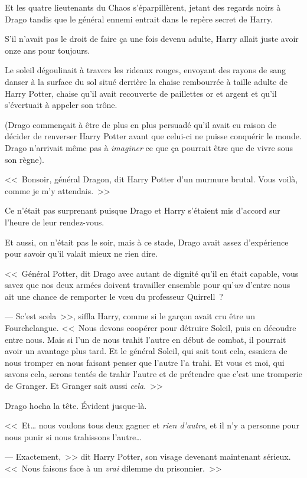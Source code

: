 Et les quatre lieutenants du Chaos s'éparpillèrent, jetant des regards noirs à Drago tandis que le général ennemi entrait dans le repère secret de Harry.

S'il n'avait pas le droit de faire ça une fois devenu adulte, Harry allait juste avoir onze ans pour toujours.

\later

Le soleil dégoulinait à travers les rideaux rouges, envoyant des rayons de sang danser à la surface du sol situé derrière la chaise rembourrée à taille adulte de Harry Potter, chaise qu'il avait recouverte de paillettes or et argent et qu'il s'évertuait à appeler son trône.

(Drago commençait à être de plus en plus persuadé qu'il avait eu raison de décider de renverser Harry Potter avant que celui-ci ne puisse conquérir le monde. Drago n'arrivait même pas à \emph{imaginer} ce que ça pourrait être que de vivre sous son règne).

<<~Bonsoir, général Dragon, dit Harry Potter d'un murmure brutal. Vous voilà, comme je m'y attendais.~>>

Ce n'était pas surprenant puisque Drago et Harry s'étaient mis d'accord sur l'heure de leur rendez-vous.

Et aussi, on n'était pas le soir, mais à ce stade, Drago avait assez d'expérience pour savoir qu'il valait mieux ne rien dire.

<<~Général Potter, dit Drago avec autant de dignité qu'il en était capable, vous savez que nos deux armées doivent travailler ensemble pour qu'\emph{un} d'entre nous ait une chance de remporter le vœu du professeur Quirrell~?

--- Sc'est scela~>>, siffla Harry, comme si le garçon avait cru être un Fourchelangue. <<~Nous devons coopérer pour détruire Soleil, puis en découdre entre nous. Mais si l'un de nous trahit l'autre en début de combat, il pourrait avoir un avantage plus tard. Et le général Soleil, qui sait tout cela, essaiera de nous tromper en nous faisant penser que l'autre l'a trahi. Et vous et moi, qui savons cela, serons tentés de trahir l'autre et de prétendre que c'est une tromperie de Granger. Et Granger sait aussi \emph{cela}.~>>

Drago hocha la tête. Évident jusque-là.

<<~Et… nous voulons tous deux gagner et \emph{rien d'autre}, et il n'y a personne pour nous punir si nous trahissons l'autre…

--- Exactement,~>> dit Harry Potter, son visage devenant maintenant sérieux. <<~Nous faisons face à un \emph{vrai} dilemme du prisonnier.~>>

